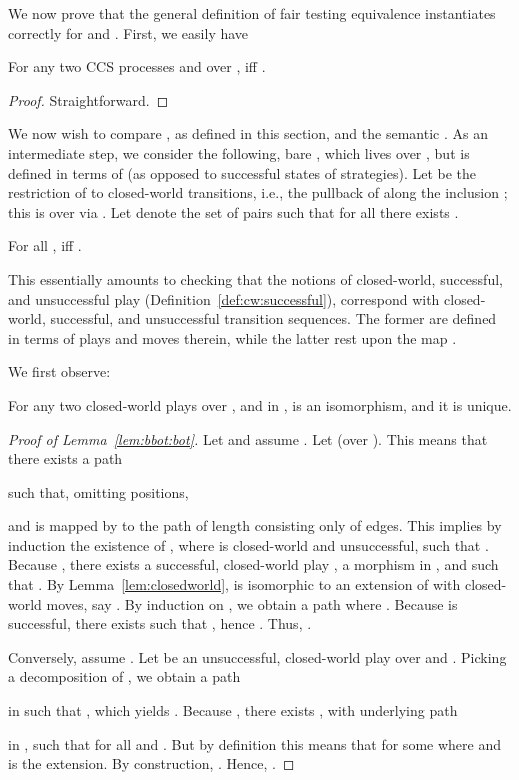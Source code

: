 \documentclass{LMCS}
\theoremstyle{plain}\newtheorem{satz}[thm]{Satz}
\begin{document}
We now prove that the general definition of fair testing equivalence
instantiates correctly for  and .  First, we easily have 
\begin{prop}\label{prop:fairccs}
  For any two CCS processes  and  over ,  iff
  .
\end{prop}
\begin{proof}
  Straightforward.
\end{proof}

We now wish to compare , as defined in this section, and
the semantic . As an intermediate step, we consider the
following, bare , which lives over , but is defined in
terms of \ltss{} (as opposed to successful states of strategies).  Let
 be the restriction of  to closed-world transitions,
i.e., the pullback of  along the inclusion ; this is \anlts{} over  via .  Let  denote the set of pairs  such that
for all  there exists .
\begin{lem}\label{lem:bbot:bot}
  For all ,   iff .
\end{lem}

This essentially amounts to checking that the notions of closed-world,
successful, and unsuccessful play
(Definition~\ref{def:cw:successful}), correspond with closed-world,
successful, and unsuccessful transition sequences.  The former are
defined in terms of plays and moves therein, while the latter rest
upon the map .

  We first observe:
\begin{lem}\label{lem:closedworld}
  For any two closed-world plays  over , and  in ,  is an isomorphism, and it is unique.
\end{lem}

\begin{proof}[Proof of Lemma~\ref{lem:bbot:bot}]
  Let  and assume . Let  (over ).  This
  means that there exists a path 

such that, omitting positions, 

and  is mapped by  to the path of length  consisting
only of  edges. This implies by induction the existence of
, where 
is closed-world and unsuccessful, such that .  Because , there exists a
successful, closed-world play , a morphism  in , and  such that .  By
Lemma~\ref{lem:closedworld},  is isomorphic to an extension of  with
closed-world moves, say . By induction on , we obtain a path
 where . Because  is successful, there exists 
such that , hence . Thus, .

Conversely, assume . Let  be an
unsuccessful, closed-world play over  and . Picking a decomposition  of , we obtain a path 

in  such that , which 
yields . Because , there exists
, with underlying path

in , such
that  for all  and .  But by definition this means that  for some
 where  and  is the extension.
By construction, . Hence, .  
\end{proof}
\end{document}
